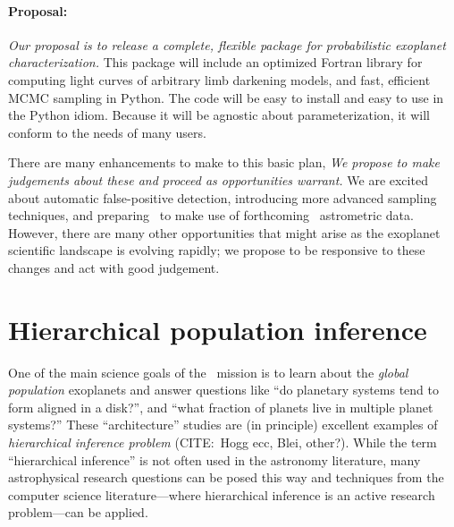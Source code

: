 \documentclass[letterpaper,12pt,preprint]{hack_aastex}
\newcommand{\Bart}{\package{Bart}}
\begin{document}
\paragraph{Proposal:}
\emph{Our proposal is to release a complete, flexible package for
  probabilistic exoplanet characterization.}  This package will
include an optimized Fortran library for computing light curves of
arbitrary limb darkening models, and fast, efficient MCMC sampling in
Python.  The code will be easy to install and easy to use in the
Python idiom.  Because it will be agnostic about parameterization, it
will conform to the needs of many users.

There are many enhancements to make to this basic plan, \emph{We
  propose to make judgements about these and proceed as opportunities
  warrant.}  We are excited about automatic false-positive detection,
introducing more advanced sampling techniques, and preparing \Bart\ to
make use of forthcoming \Gaia\ astrometric data.  However, there are
many other opportunities that might arise as the exoplanet scientific
landscape is evolving rapidly; we propose to be responsive to these
changes and act with good judgement.


\section{Hierarchical population inference}

One of the main science goals of the \Kepler\ mission is to learn about the
\emph{global population} exoplanets and answer questions like ``do planetary
systems tend to form aligned in a disk?'', and ``what fraction of planets live
in multiple planet systems?''
These ``architecture'' studies are (in principle)
excellent examples of \emph{hierarchical inference problem}
 (CITE:\ Hogg ecc, Blei, other?).
While the term ``hierarchical inference'' is not often used in the astronomy
literature, many astrophysical research questions can be posed this way and
techniques from the computer science literature---where hierarchical inference
is an active research problem---can be applied.
\end{document}
